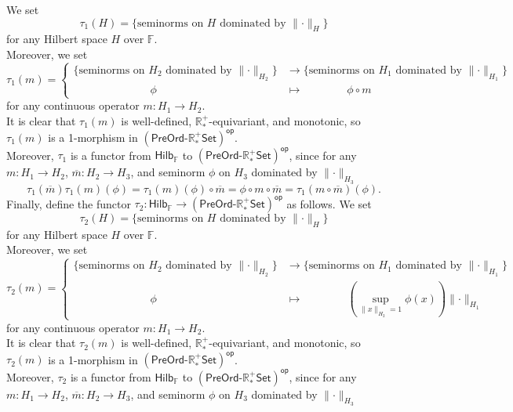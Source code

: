 \documentclass[a4paper,10pt]{article}
\theoremstyle{plain}
\theoremstyle{definition}
\theoremstyle{remark}
\begin{document}
We set
\[ \tau_1(H) = \{ \text{seminorms on } H \text{ dominated by } \lVert \cdot \rVert_H \} \]
for any Hilbert space $H$ over $\mathbb{F}$. \\
Moreover, we set
\[ \tau_1(m) = \begin{cases} \{ \text{seminorms on } H_2 \text{ dominated by } \lVert \cdot \rVert_{H_2} \} &\to \{ \text{seminorms on } H_1 \text{ dominated by } \lVert \cdot \rVert_{H_1} \} \\ \quad \quad \quad \quad \quad \quad \quad \phi &\mapsto \quad \quad \quad \quad \phi \circ m \end{cases} \]
for any continuous operator $m : H_1 \to H_2$. \\
It is clear that $\tau_1(m)$ is well-defined, $\mathbb{R}^+_*$-equivariant, and monotonic, so $\tau_1(m)$ is a 1-morphism in $\mathsf{(PreOrd\text{-}\mathbb{R}^+_*Set)^{op}}$. \\
Moreover, $\tau_1$ is a functor from $\mathsf{Hilb_\mathbb{F}}$ to $\mathsf{(PreOrd\text{-}\mathbb{R}^+_*Set)^{op}}$, since for any $m : H_1 \to H_2$, $\overline{m} : H_2 \to H_3$, and seminorm $\phi$ on $H_3$ dominated by $\lVert \cdot \rVert_{H_3}$
\[ \tau_1(\overline{m})\tau_1(m)(\phi) = \tau_1(m)(\phi) \circ \overline{m} = \phi \circ m \circ \overline{m} = \tau_1(m \circ \overline{m})(\phi). \]
Finally, define the functor $\tau_2 : \mathsf{Hilb_\mathbb{F}} \to \mathsf{(PreOrd\text{-}\mathbb{R}^+_*Set)^{op}}$ as follows.
We set
\[ \tau_2(H) = \{ \text{seminorms on } H \text{ dominated by } \lVert \cdot \rVert_H \} \]
for any Hilbert space $H$ over $\mathbb{F}$. \\
Moreover, we set
\[ \tau_2(m) = \begin{cases} \{ \text{seminorms on } H_2 \text{ dominated by } \lVert \cdot \rVert_{H_2} \} &\to \{ \text{seminorms on } H_1 \text{ dominated by } \lVert \cdot \rVert_{H_1} \} \\ \quad \quad \quad \quad \quad \quad \quad \phi &\mapsto \quad \quad \quad \quad \left( \underset{\lVert x \rVert_{H_2} = 1}{\operatorname{sup}} \phi(x) \right) \lVert \cdot \rVert_{H_1} \end{cases} \]
for any continuous operator $m : H_1 \to H_2$. \\
It is clear that $\tau_2(m)$ is well-defined, $\mathbb{R}^+_*$-equivariant, and monotonic, so $\tau_2(m)$ is a 1-morphism in $\mathsf{(PreOrd\text{-}\mathbb{R}^+_*Set)^{op}}$. \\
Moreover, $\tau_2$ is a functor from $\mathsf{Hilb_\mathbb{F}}$ to $\mathsf{(PreOrd\text{-}\mathbb{R}^+_*Set)^{op}}$, since for any $m : H_1 \to H_2$, $\overline{m} : H_2 \to H_3$, and seminorm $\phi$ on $H_3$ dominated by $\lVert \cdot \rVert_{H_3}$
\end{document}
